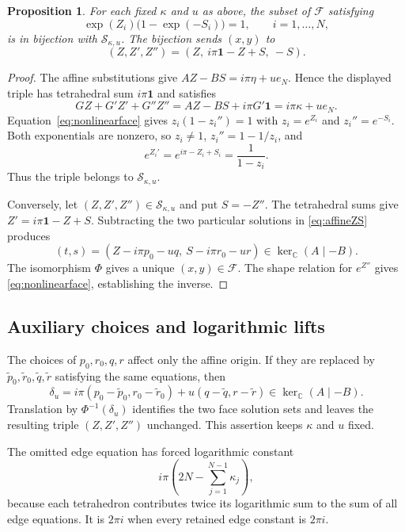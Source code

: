 \documentclass[11pt]{article}
\newtheorem{proposition}[theorem]{Proposition}
\theoremstyle{definition}\newtheorem{definition}[theorem]{Definition}
\theoremstyle{remark}\newtheorem{remark}[theorem]{Remark}
\begin{document}
\begin{proposition}\label{prop:affine}
For each fixed $\kappa$ and $u$ as above, the subset of $\mathcal F$ satisfying
\begin{equation}
\exp(Z_i)\big(1-\exp(-S_i)\big)=1,\qquad i=1,\ldots,N,
\label{eq:nonlinearface}
\end{equation}
is in bijection with $\mathcal S_{\kappa,u}$. The bijection sends $(x,y)$ to
\[
(Z,Z',Z'')=(Z,\ i\pi\mathbf1-Z+S,\ -S).
\]
\end{proposition}
\begin{proof}
The affine substitutions give $AZ-BS=i\pi\eta+u e_N$. Hence the displayed triple has tetrahedral sum $i\pi\mathbf1$ and satisfies
\[
GZ+G'Z'+G''Z''=AZ-BS+i\pi G'\mathbf1
=i\pi\kappa+u e_N.
\]
Equation~\eqref{eq:nonlinearface} gives $z_i(1-z_i'')=1$ with $z_i=e^{Z_i}$ and $z_i''=e^{-S_i}$. Both exponentials are nonzero, so $z_i\ne1$, $z_i''=1-1/z_i$, and
\[
e^{Z_i'}=e^{i\pi-Z_i+S_i}=\frac{1}{1-z_i}.
\]
Thus the triple belongs to $\mathcal S_{\kappa,u}$.

Conversely, let $(Z,Z',Z'')\in\mathcal S_{\kappa,u}$ and put $S=-Z''$. The tetrahedral sums give $Z'=i\pi\mathbf1-Z+S$. Subtracting the two particular solutions in \eqref{eq:affineZS} produces
\[
(t,s)=(Z-i\pi p_0-uq,\ S-i\pi r_0-ur)\in\ker_{\mathbb C}(A\mid-B).
\]
The isomorphism $\Phi$ gives a unique $(x,y)\in\mathcal F$. The shape relation for $e^{Z''}$ gives \eqref{eq:nonlinearface}, establishing the inverse.
\end{proof}

\subsection{Auxiliary choices and logarithmic lifts}
The choices of $p_0,r_0,q,r$ affect only the affine origin. If they are replaced by $\widetilde p_0,\widetilde r_0,\widetilde q,\widetilde r$ satisfying the same equations, then
\[
\delta_u=i\pi(p_0-\widetilde p_0,r_0-\widetilde r_0)
+u(q-\widetilde q,r-\widetilde r)
\in\ker_{\mathbb C}(A\mid-B).
\]
Translation by $\Phi^{-1}(\delta_u)$ identifies the two face solution sets and leaves the resulting triple $(Z,Z',Z'')$ unchanged. This assertion keeps $\kappa$ and $u$ fixed.

The omitted edge equation has forced logarithmic constant
\[
i\pi\left(2N-\sum_{j=1}^{N-1}\kappa_j\right),
\]
because each tetrahedron contributes twice its logarithmic sum to the sum of all edge equations. It is $2\pi i$ when every retained edge constant is $2\pi i$.
\end{document}
